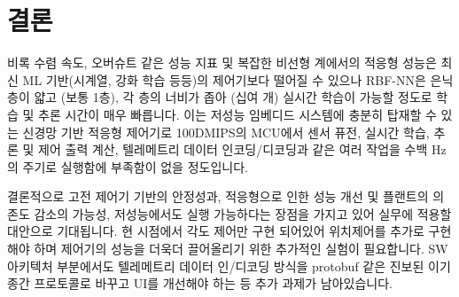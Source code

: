 \section{결론}
비록 수렴 속도, 오버슈트 같은 성능 지표 및 복잡한 비선형 계에서의 적응형 성능은 최신 ML 기반(시계열, 강화 학습 등등)의 제어기보다 떨어질 수 있으나 RBF-NN은 은닉층이 얇고 (보통 1층), 각 층의 너비가 좁아 (십여 개) 실시간 학습이 가능할 정도로 학습 및 추론 시간이 매우 빠릅니다.
%
이는 저성능 임베디드 시스템에 충분히 탑재할 수 있는 신경망 기반 적응형 제어기로 100DMIPS의 MCU에서 센서 퓨전, 실시간 학습, 추론 및 제어 출력 계산,  텔레메트리 데이터 인코딩/디코딩과 같은 여러 작업을 수백 Hz의 주기로 실행함에 부족함이 없을 정도입니다.

결론적으로 고전 제어기 기반의 안정성과, 적응형으로 인한 성능 개선 및 플랜트의 의존도 감소의 가능성, 저성능에서도 실행 가능하다는 장점을 가지고 있어 실무에 적용할 대안으로 기대됩니다.
%
현 시점에서 각도 제어만 구현 되어있어 위치제어를 추가로 구현해야 하며 제어기의 성능을 더욱더 끌어올리기 위한 추가적인 실험이 필요합니다. SW 아키텍처 부분에서도 텔레메트리 데이터 인/디코딩 방식을 protobuf 같은 진보된 이기종간 프로토콜로 바꾸고 UI를 개선해야 하는 등 추가 과제가 남아있습니다. 

\clearpage